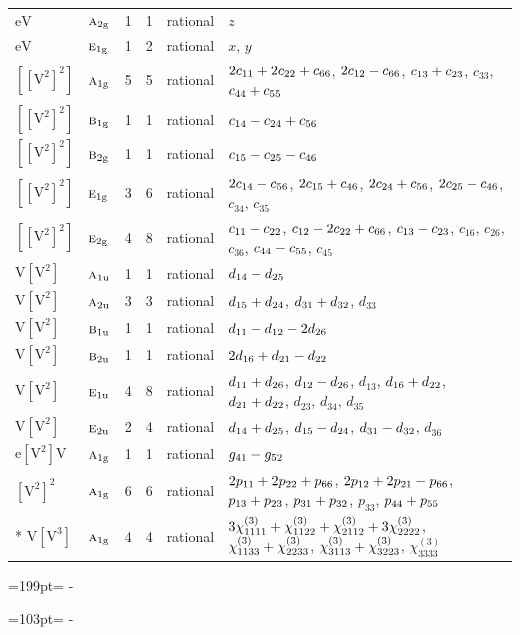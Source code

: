 \documentclass[10pt,a4paper]{article}
\newcommand{\needspace}[1]{\par\penalty-100\begingroup\dimen0=#1\relax\dimen2=\pagegoal
  \advance\dimen2-\pagetotal\ifdim\dimen0>\dimen2\relax\ifdim\dimen2>0pt\vfil\break\fi\fi
  \endgroup}
\numberwithin{equation}{section}
\newcommand{\irr}[1]{\text{\normalfont\scshape #1}}
\newcommand{\ptag}[1]{\mathrm{#1}}
\newcommand{\jahn}[1]{\mathrm{#1}}
\newlength{\fillwidth}\newlength{\cellwidth}\newlength{\colwidth}
\newcommand{\signbreak}{\penalty100\relax}
\begin{document}
{\begin{longtable}{@{}llrrl>{\RaggedRight\arraybackslash}p{\fillwidth}@{}}
$\jahn{eV}$ & $\irr{a}_{2\ptag{g}}$ & 1 & 1 & rational & $z$\\
$\jahn{eV}$ & $\irr{e}_{1\ptag{g}}$ & 1 & 2 & rational & $x$, $y$\\
$\jahn{[[V^{2}]^{2}]}$ & $\irr{a}_{1\ptag{g}}$ & 5 & 5 & rational & $2c_{11} +\signbreak 2c_{22} +\signbreak c_{66}$, $2c_{12} -\signbreak c_{66}$, $c_{13} +\signbreak c_{23}$, $c_{33}$, $c_{44} +\signbreak c_{55}$\\
$\jahn{[[V^{2}]^{2}]}$ & $\irr{b}_{1\ptag{g}}$ & 1 & 1 & rational & $c_{14} -\signbreak c_{24} +\signbreak c_{56}$\\
$\jahn{[[V^{2}]^{2}]}$ & $\irr{b}_{2\ptag{g}}$ & 1 & 1 & rational & $c_{15} -\signbreak c_{25} -\signbreak c_{46}$\\
$\jahn{[[V^{2}]^{2}]}$ & $\irr{e}_{1\ptag{g}}$ & 3 & 6 & rational & $2c_{14} -\signbreak c_{56}$, $2c_{15} +\signbreak c_{46}$, $2c_{24} +\signbreak c_{56}$, $2c_{25} -\signbreak c_{46}$, $c_{34}$, $c_{35}$\\
$\jahn{[[V^{2}]^{2}]}$ & $\irr{e}_{2\ptag{g}}$ & 4 & 8 & rational & $c_{11} -\signbreak c_{22}$, $c_{12} -\signbreak 2c_{22} +\signbreak c_{66}$, $c_{13} -\signbreak c_{23}$, $c_{16}$, $c_{26}$, $c_{36}$, $c_{44} -\signbreak c_{55}$, $c_{45}$\\
$\jahn{V[V^{2}]}$ & $\irr{a}_{1\ptag{u}}$ & 1 & 1 & rational & $d_{14} -\signbreak d_{25}$\\
$\jahn{V[V^{2}]}$ & $\irr{a}_{2\ptag{u}}$ & 3 & 3 & rational & $d_{15} +\signbreak d_{24}$, $d_{31} +\signbreak d_{32}$, $d_{33}$\\
$\jahn{V[V^{2}]}$ & $\irr{b}_{1\ptag{u}}$ & 1 & 1 & rational & $d_{11} -\signbreak d_{12} -\signbreak 2d_{26}$\\
$\jahn{V[V^{2}]}$ & $\irr{b}_{2\ptag{u}}$ & 1 & 1 & rational & $2d_{16} +\signbreak d_{21} -\signbreak d_{22}$\\
$\jahn{V[V^{2}]}$ & $\irr{e}_{1\ptag{u}}$ & 4 & 8 & rational & $d_{11} +\signbreak d_{26}$, $d_{12} -\signbreak d_{26}$, $d_{13}$, $d_{16} +\signbreak d_{22}$, $d_{21} +\signbreak d_{22}$, $d_{23}$, $d_{34}$, $d_{35}$\\
$\jahn{V[V^{2}]}$ & $\irr{e}_{2\ptag{u}}$ & 2 & 4 & rational & $d_{14} +\signbreak d_{25}$, $d_{15} -\signbreak d_{24}$, $d_{31} -\signbreak d_{32}$, $d_{36}$\\
$\jahn{e[V^{2}]V}$ & $\irr{a}_{1\ptag{g}}$ & 1 & 1 & rational & $\mathnormal{g}_{41} -\signbreak \mathnormal{g}_{52}$\\
$\jahn{[V^{2}]^{2}}$ & $\irr{a}_{1\ptag{g}}$ & 6 & 6 & rational & $2p_{11} +\signbreak 2p_{22} +\signbreak p_{66}$, $2p_{12} +\signbreak 2p_{21} -\signbreak p_{66}$, $p_{13} +\signbreak p_{23}$, $p_{31} +\signbreak p_{32}$, $p_{33}$, $p_{44} +\signbreak p_{55}$\\*
$\jahn{V[V^{3}]}$ & $\irr{a}_{1\ptag{g}}$ & 4 & 4 & rational & $3\chi^{(3)}_{1111} +\signbreak \chi^{(3)}_{1122} +\signbreak \chi^{(3)}_{2112} +\signbreak 3\chi^{(3)}_{2222}$, $\chi^{(3)}_{1133} +\signbreak \chi^{(3)}_{2233}$, $\chi^{(3)}_{3113} +\signbreak \chi^{(3)}_{3223}$, $\chi^{(3)}_{3333}$\\
\bottomrule\end{longtable}}
\needspace{199pt}
\needspace{103pt}
\end{document}
